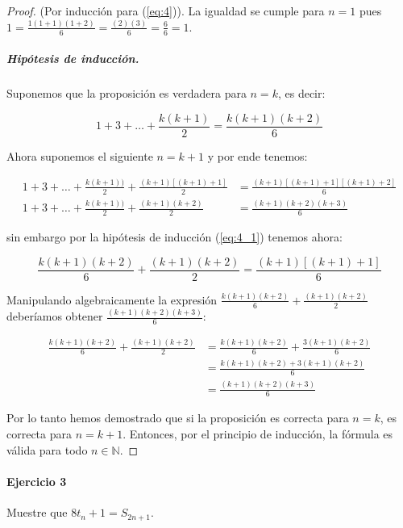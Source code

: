 \documentclass{article}
\begin{document}
\begin{proof}(Por inducción para (\ref{eq:4})). La igualdad se cumple para $n=1$ pues $1 = \frac{1(1+1)(1+2)}{6} = \frac{(2)(3)}{6} = \frac{6}{6} = 1$.
	
\subparagraph{Hipótesis de inducción.} Suponemos que la proposición es verdadera para $n=k$, es decir:

	\begin{equation}\label{eq:4_1}
		1 + 3 + \dots + \frac{k(k+1)}{2} = \frac{k(k+1)(k+2)}{6}
	\end{equation}

Ahora suponemos el siguiente $n = k + 1$ y por ende tenemos:

\begin{align*}
    1 + 3 + \dots + \frac{k(k+1))}{2} + \frac{(k+1)[(k+1) + 1]}{2} &= \frac{(k+1)[(k+1) + 1][(k+1)+2]}{6}\\
    1 + 3 + \dots + \frac{k(k+1))}{2} + \frac{(k+1)(k+2)}{2} &= \frac{(k+1)(k+2)(k+3)}{6}
\end{align*}

sin embargo por la hipótesis de inducción (\ref{eq:4_1}) tenemos ahora:

\[
	\frac{k(k+1)(k+2)}{6} + \frac{(k+1)(k+2)}{2} = \frac{(k+1)[(k+1)+1]}{6}
\]

Manipulando algebraicamente la expresión $\frac{k(k+1)(k+2)}{6} + \frac{(k+1)(k+2)}{2}$ deberíamos obtener $\frac{(k+1)(k+2)(k+3)}{6}$:

\begin{align*}
	\frac{k(k+1)(k+2)}{6} + \frac{(k+1)(k+2)}{2} &= \frac{k(k+1)(k+2)}{6} + \frac{3(k+1)(k+2)}{6}\\ &= \frac{k(k+1)(k+2) + 3(k+1)(k+2)}{6}\\
	&= \frac{(k+1)(k+2)(k+3)}{6}
\end{align*}

Por lo tanto hemos demostrado que si la proposición es correcta para $n = k$, es correcta para $n=k+1$. Entonces, por el principio de inducción, la fórmula es válida para todo $n \in \mathbb{N}$.
\end{proof}

\paragraph{Ejercicio 3} Muestre que $8t_n + 1 = S_{2n+1}$.
\end{document}
